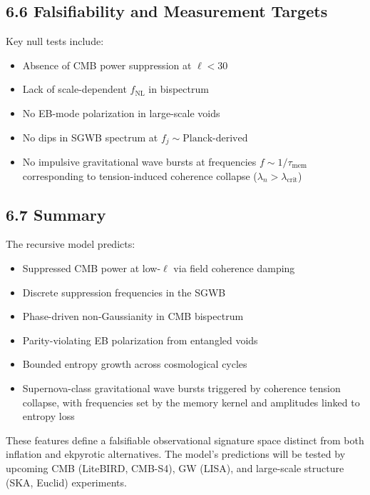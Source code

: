 \subsection{6.6 Falsifiability and Measurement Targets}

Key null tests include:
\begin{itemize}
    \item Absence of CMB power suppression at \( \ell < 30 \)
    \item Lack of scale-dependent \( f_{\text{NL}} \) in bispectrum
    \item No EB-mode polarization in large-scale voids
    \item No dips in SGWB spectrum at \( f_j \sim \text{Planck-derived} \)
    \item No impulsive gravitational wave bursts at frequencies \( f \sim 1/\tau_{\text{mem}} \) corresponding to tension-induced coherence collapse (\( \lambda_n > \lambda_{\text{crit}} \))
\end{itemize}

\subsection{6.7 Summary}

The recursive model predicts:
\begin{itemize}
    \item Suppressed CMB power at low-\( \ell \) via field coherence damping
    \item Discrete suppression frequencies in the SGWB
    \item Phase-driven non-Gaussianity in CMB bispectrum
    \item Parity-violating EB polarization from entangled voids
    \item Bounded entropy growth across cosmological cycles
    \item Supernova-class gravitational wave bursts triggered by coherence tension collapse, with frequencies set by the memory kernel and amplitudes linked to entropy loss
\end{itemize}

These features define a falsifiable observational signature space distinct from both inflation and ekpyrotic alternatives. The model’s predictions will be tested by upcoming CMB (LiteBIRD, CMB-S4), GW (LISA), and large-scale structure (SKA, Euclid) experiments.
